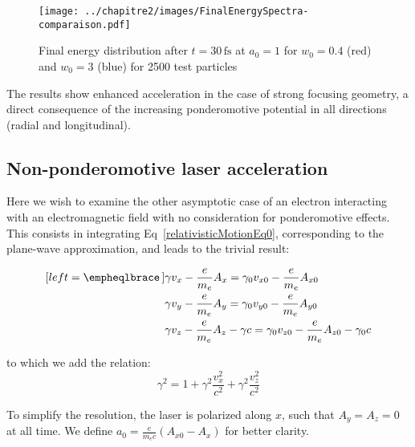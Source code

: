 \begin{figure}[H]
\begin{center}
\texttt{[image: ../chapitre2/images/FinalEnergySpectra-comparaison.pdf]}
\caption{\label{fig:FinalElectronSpectra}Final energy distribution after $t = 30\,\mathrm{fs}$ at $a_0 = 1$ for  $w_0 = 0.4$ (red) and $w_0 = 3$ (blue) for 2500 test particles}
\end{center}
\end{figure}

\noindent The results show enhanced acceleration in the case of strong focusing geometry, a direct consequence of the increasing ponderomotive potential in all directions (radial and longitudinal).

\subsection{Non-ponderomotive laser acceleration}\label{subsub:Non ponderomotive laser acceleration}


Here we wish to examine the other asymptotic case of an electron interacting with an electromagnetic field with no consideration for ponderomotive effects. 
This consists in integrating Eq~\ref{relativisticMotionEq0}, corresponding to the plane-wave approximation, and leads to the trivial result:



\begin{subequations}
\label{relativisticMotionEq0-int}
\begin{align}[left = \empheqlbrace\,]
&\gamma v_x - \frac{e}{m_e}A_x = \gamma_0 v_{x0} - \frac{e}{m_e}A_{x0}  \label{relativisticMotionEq0-1} \\
&\gamma v_y - \frac{e}{m_e}A_y = \gamma_0 v_{y0} - \frac{e}{m_e}A_{y0}  \label{relativisticMotionEq0-2} \\
&\gamma v_z -\frac{e}{m_e}A_z-\gamma c =\gamma_0 v_{z0}-\frac{e}{m_e}A_{z0} -\gamma_0 c  \label{relativisticMotionEq0-3} 
\end{align}
\end{subequations}

\noindent to which we add the relation:
\begin{equation}
\label{eq:Gamma-factor}
\gamma^2 = 1+\gamma^2\frac{v_x^2}{c^2}+\gamma^2\frac{v_z^2}{c^2}
\end{equation}

\noindent To simplify the resolution, the laser is polarized along $x$, such that $A_y = A_z =0$ at all time.
We define $a_0 = \frac{e}{m_e c}(A_{x0}-A_x) $ for better clarity.

